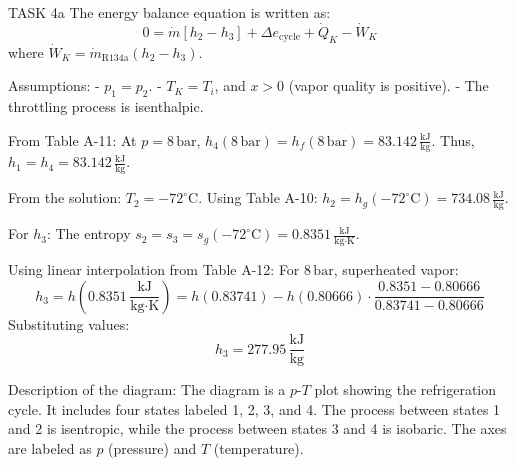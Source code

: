 TASK 4a  
The energy balance equation is written as:  
\[
0 = \dot{m} \left[ h_2 - h_3 \right] + \Delta e_{\text{cycle}} + \dot{Q}_K - \dot{W}_K
\]  
where \( \dot{W}_K = \dot{m}_{\text{R134a}} \left( h_2 - h_3 \right) \).  

Assumptions:  
- \( p_1 = p_2 \).  
- \( T_K = T_i \), and \( x > 0 \) (vapor quality is positive).  
- The throttling process is isenthalpic.  

From Table A-11:  
At \( p = 8 \, \text{bar} \), \( h_4(8 \, \text{bar}) = h_f(8 \, \text{bar}) = 83.142 \, \frac{\text{kJ}}{\text{kg}} \).  
Thus, \( h_1 = h_4 = 83.142 \, \frac{\text{kJ}}{\text{kg}} \).  

From the solution:  
\( T_2 = -72^\circ\text{C} \).  
Using Table A-10:  
\( h_2 = h_g(-72^\circ\text{C}) = 734.08 \, \frac{\text{kJ}}{\text{kg}} \).  

For \( h_3 \):  
The entropy \( s_2 = s_3 = s_g(-72^\circ\text{C}) = 0.8351 \, \frac{\text{kJ}}{\text{kg·K}} \).  

Using linear interpolation from Table A-12:  
For \( 8 \, \text{bar} \), superheated vapor:  
\[
h_3 = h \left( 0.8351 \, \frac{\text{kJ}}{\text{kg·K}} \right) = h \left( 0.83741 \right) - h \left( 0.80666 \right) \cdot \frac{0.8351 - 0.80666}{0.83741 - 0.80666}
\]  
Substituting values:  
\[
h_3 = 277.95 \, \frac{\text{kJ}}{\text{kg}}
\]  

Description of the diagram:  
The diagram is a \( p \)-\( T \) plot showing the refrigeration cycle. It includes four states labeled 1, 2, 3, and 4. The process between states 1 and 2 is isentropic, while the process between states 3 and 4 is isobaric. The axes are labeled as \( p \) (pressure) and \( T \) (temperature).
